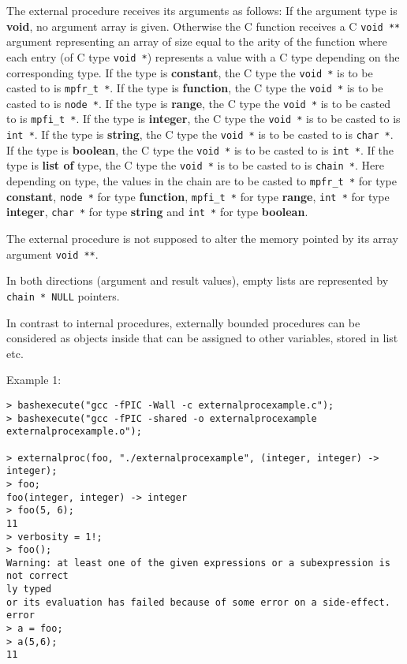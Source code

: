 \begin{itemize}
   The external procedure receives its arguments as follows: If the
   \sollya argument type is \textbf{void}, no argument array is given.  Otherwise
   the C function receives a C \texttt{void **} argument representing an array of
   size equal to the arity of the function where each entry (of C type
   \texttt{void *}) represents a value with a C type depending on the
   corresponding \sollya type. If the \sollya type is \textbf{constant}, the C
   type the \texttt{void *} is to be casted to is \texttt{mpfr\_t *}.  If the \sollya type
   is \textbf{function}, the C type the \texttt{void *} is to be casted to is \texttt{node *}.  If
   the \sollya type is \textbf{range}, the C type the \texttt{void *} is to be casted to is
   \texttt{mpfi\_t *}.  If the \sollya type is \textbf{integer}, the C type the \texttt{void *} is to
   be casted to is \texttt{int *}.  If the \sollya type is \textbf{string}, the C type the
   \texttt{void *} is to be casted to is \texttt{char *}.  If the \sollya type is \textbf{boolean},
   the C type the \texttt{void *} is to be casted to is \texttt{int *}.  If the \sollya
   type is \textbf{list of} type, the C type the \texttt{void *} is to be casted to is
   \texttt{chain *}.  Here depending on type, the values in the chain are to be
   casted to \texttt{mpfr\_t *}  for \sollya type \textbf{constant}, \texttt{node *} for \sollya type
   \textbf{function}, \texttt{mpfi\_t *} for \sollya type \textbf{range}, \texttt{int *} for \sollya type
   \textbf{integer}, \texttt{char *} for \sollya type \textbf{string} and \texttt{int *} for \sollya type
   \textbf{boolean}.
    
   The external procedure is not supposed to alter the memory pointed by
   its array argument \texttt{void **}.
    
   In both directions (argument and result values), empty lists are
   represented by \texttt{chain * NULL} pointers.
    
   In contrast to internal procedures, externally bounded procedures can
   be considered as objects inside \sollya that can be assigned to other
   variables, stored in list etc.
\end{itemize}
\noindent Example 1: 
\begin{center}\begin{minipage}{15cm}\begin{Verbatim}[frame=single]
> bashexecute("gcc -fPIC -Wall -c externalprocexample.c");
> bashexecute("gcc -fPIC -shared -o externalprocexample externalprocexample.o");

> externalproc(foo, "./externalprocexample", (integer, integer) -> integer);
> foo;
foo(integer, integer) -> integer
> foo(5, 6);
11
> verbosity = 1!;
> foo();
Warning: at least one of the given expressions or a subexpression is not correct
ly typed
or its evaluation has failed because of some error on a side-effect.
error
> a = foo;
> a(5,6);
11
\end{Verbatim}
\end{minipage}\end{center}
